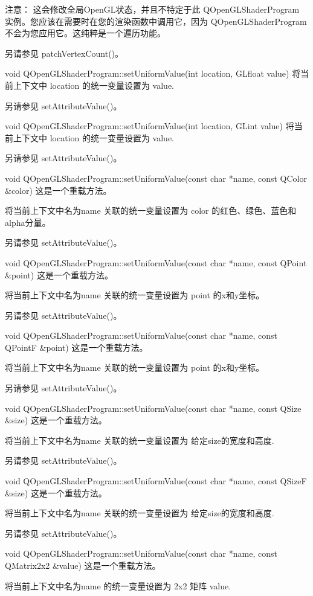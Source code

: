 注意： 这会修改全局OpenGL状态，并且不特定于此 QOpenGLShaderProgram 实例。您应该在需要时在您的渲染函数中调用它，因为 QOpenGLShaderProgram 不会为您应用它。这纯粹是一个遍历功能。

另请参见 patchVertexCount()。

void QOpenGLShaderProgram::setUniformValue(int location, GLfloat value)
将当前上下文中 location 的统一变量设置为 value.

另请参见 setAttributeValue()。

void QOpenGLShaderProgram::setUniformValue(int location, GLint value)
将当前上下文中 location 的统一变量设置为 value.

另请参见 setAttributeValue()。

void QOpenGLShaderProgram::setUniformValue(const char *name, const QColor \&color)
这是一个重载方法。

将当前上下文中名为name 关联的统一变量设置为 color 的红色、绿色、蓝色和alpha分量。

另请参见 setAttributeValue()。

void QOpenGLShaderProgram::setUniformValue(const char *name, const QPoint \&point)
这是一个重载方法。

将当前上下文中名为name 关联的统一变量设置为 point 的x和y坐标。

另请参见 setAttributeValue()。

void QOpenGLShaderProgram::setUniformValue(const char *name, const QPointF \&point)
这是一个重载方法。

将当前上下文中名为name 关联的统一变量设置为 point 的x和y坐标。

另请参见 setAttributeValue()。

void QOpenGLShaderProgram::setUniformValue(const char *name, const QSize \&size)
这是一个重载方法。

将当前上下文中名为name 关联的统一变量设置为 给定size的宽度和高度.

另请参见 setAttributeValue()。

void QOpenGLShaderProgram::setUniformValue(const char *name, const QSizeF \&size)
这是一个重载方法。

将当前上下文中名为name 关联的统一变量设置为 给定size的宽度和高度.

另请参见 setAttributeValue()。

void QOpenGLShaderProgram::setUniformValue(const char *name, const QMatrix2x2 \&value)
这是一个重载方法。

将当前上下文中名为name 的统一变量设置为 2x2 矩阵 value.


